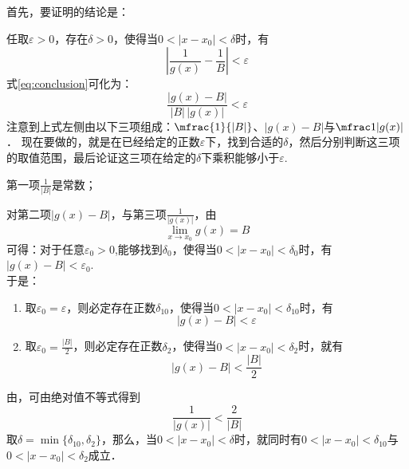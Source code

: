 首先，要证明的结论是：\par
任取$\varepsilon>0$，存在$\delta>0$，使得当$0<|x-x_0|<\delta$时，有
    \begin{equation}
        \left|\frac{1}{g(x)}-\frac{1}{B}\right|<\varepsilon\label{eq:conclusion}
    \end{equation}
式\eqref{eq:conclusion}可化为：
\begin{equation}
    \frac{|g(x)-B|}{|B|\,|g(x)|}<\varepsilon\label{eq:2}
\end{equation}
注意到上式左侧由以下三项组成：$\mfrac{1}{|B|}$、$|g(x)-B|$与$\mfrac1{|g(x)|}$．
现在要做的，就是在已经给定的正数$\varepsilon$下，找到合适的$\delta$，然后分别判断这三项的取值范围，最后论证这三项在给定的$\delta$下乘积能够小于$\varepsilon$.\par
第一项$\frac1{|B|}$是常数；\par
对第二项$|g(x)-B|$，与第三项$\frac1{|g(x)|}$，由
\begin{equation}
    \lim_{x \to x_0} g(x)=B\label{eq:lim}
\end{equation}
可得：对于任意$\varepsilon_0>0$,能够找到$\delta_0$，使得当$0<|x-x_0|<\delta_0$时，有$|g(x)-B|<\varepsilon_0$.\\
于是：
\begin{enumerate}[label=\circled{\arabic*}]
    \item 取$\varepsilon_0=\varepsilon$，则必定存在正数$\delta_{10}$，使得当$0<|x-x_0|<\delta_{10}$时，有
        \begin{equation}
            |g(x)-B|<\varepsilon\label{eq:lim1}
        \end{equation}
    \item 取$\varepsilon_0=\frac{|B|}{2}$，则必定存在正数$\delta_2$，使得当$0<|x-x_0|<\delta_2$时，就有
        \begin{equation}
            |g(x)-B|<\frac{|B|}{2}\label{eq:lim2}
        \end{equation}
\end{enumerate}
由，可由绝对值不等式得到
    \begin{equation}
        \frac1{|g(x)|}<\frac{2}{|B|}\label{eq:lim2-1}
    \end{equation}
取$\delta=\min\{\delta_{10},\delta_2\}$，那么，当$0<|x-x_0|<\delta$时，就同时有$0<|x-x_0|<\delta_{10}$与$0<|x-x_0|<\delta_2$成立．\\
